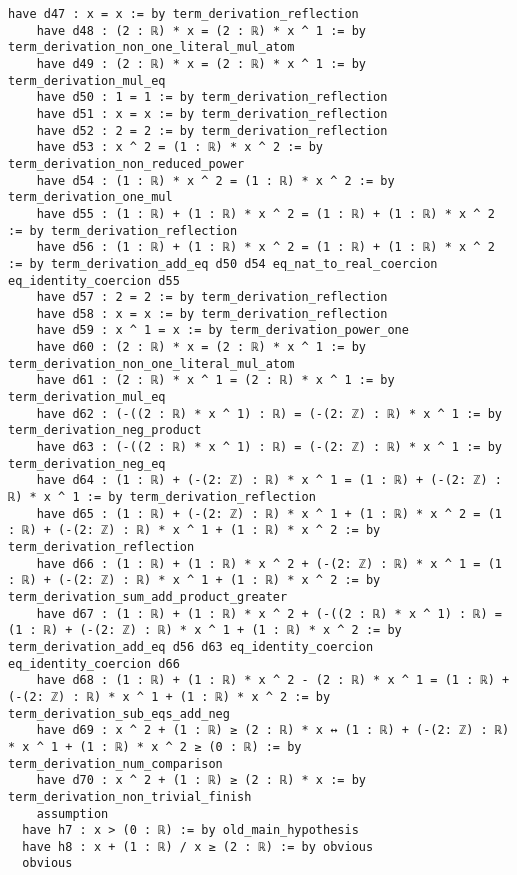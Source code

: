 \documentclass{article}
\begin{document}
\begin{tcolorbox}[colback=white!10, width=\linewidth]
\begin{lstlisting}[language=Lean4]
    have d47 : x = x := by term_derivation_reflection
    have d48 : (2 : ℝ) * x = (2 : ℝ) * x ^ 1 := by term_derivation_non_one_literal_mul_atom
    have d49 : (2 : ℝ) * x = (2 : ℝ) * x ^ 1 := by term_derivation_mul_eq
    have d50 : 1 = 1 := by term_derivation_reflection
    have d51 : x = x := by term_derivation_reflection
    have d52 : 2 = 2 := by term_derivation_reflection
    have d53 : x ^ 2 = (1 : ℝ) * x ^ 2 := by term_derivation_non_reduced_power
    have d54 : (1 : ℝ) * x ^ 2 = (1 : ℝ) * x ^ 2 := by term_derivation_one_mul
    have d55 : (1 : ℝ) + (1 : ℝ) * x ^ 2 = (1 : ℝ) + (1 : ℝ) * x ^ 2 := by term_derivation_reflection
    have d56 : (1 : ℝ) + (1 : ℝ) * x ^ 2 = (1 : ℝ) + (1 : ℝ) * x ^ 2 := by term_derivation_add_eq d50 d54 eq_nat_to_real_coercion eq_identity_coercion d55
    have d57 : 2 = 2 := by term_derivation_reflection
    have d58 : x = x := by term_derivation_reflection
    have d59 : x ^ 1 = x := by term_derivation_power_one
    have d60 : (2 : ℝ) * x = (2 : ℝ) * x ^ 1 := by term_derivation_non_one_literal_mul_atom
    have d61 : (2 : ℝ) * x ^ 1 = (2 : ℝ) * x ^ 1 := by term_derivation_mul_eq
    have d62 : (-((2 : ℝ) * x ^ 1) : ℝ) = (-(2: ℤ) : ℝ) * x ^ 1 := by term_derivation_neg_product
    have d63 : (-((2 : ℝ) * x ^ 1) : ℝ) = (-(2: ℤ) : ℝ) * x ^ 1 := by term_derivation_neg_eq
    have d64 : (1 : ℝ) + (-(2: ℤ) : ℝ) * x ^ 1 = (1 : ℝ) + (-(2: ℤ) : ℝ) * x ^ 1 := by term_derivation_reflection
    have d65 : (1 : ℝ) + (-(2: ℤ) : ℝ) * x ^ 1 + (1 : ℝ) * x ^ 2 = (1 : ℝ) + (-(2: ℤ) : ℝ) * x ^ 1 + (1 : ℝ) * x ^ 2 := by term_derivation_reflection
    have d66 : (1 : ℝ) + (1 : ℝ) * x ^ 2 + (-(2: ℤ) : ℝ) * x ^ 1 = (1 : ℝ) + (-(2: ℤ) : ℝ) * x ^ 1 + (1 : ℝ) * x ^ 2 := by term_derivation_sum_add_product_greater
    have d67 : (1 : ℝ) + (1 : ℝ) * x ^ 2 + (-((2 : ℝ) * x ^ 1) : ℝ) = (1 : ℝ) + (-(2: ℤ) : ℝ) * x ^ 1 + (1 : ℝ) * x ^ 2 := by term_derivation_add_eq d56 d63 eq_identity_coercion eq_identity_coercion d66
    have d68 : (1 : ℝ) + (1 : ℝ) * x ^ 2 - (2 : ℝ) * x ^ 1 = (1 : ℝ) + (-(2: ℤ) : ℝ) * x ^ 1 + (1 : ℝ) * x ^ 2 := by term_derivation_sub_eqs_add_neg
    have d69 : x ^ 2 + (1 : ℝ) ≥ (2 : ℝ) * x ↔ (1 : ℝ) + (-(2: ℤ) : ℝ) * x ^ 1 + (1 : ℝ) * x ^ 2 ≥ (0 : ℝ) := by term_derivation_num_comparison
    have d70 : x ^ 2 + (1 : ℝ) ≥ (2 : ℝ) * x := by term_derivation_non_trivial_finish
    assumption
  have h7 : x > (0 : ℝ) := by old_main_hypothesis
  have h8 : x + (1 : ℝ) / x ≥ (2 : ℝ) := by obvious
  obvious

\end{lstlisting}
\end{tcolorbox}
\end{document}
